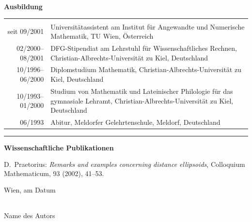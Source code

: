 \documentclass[a4paper,11pt,bibliography=totoc,listof=totoc,headinclude=true,cleardoublepage=empty,oneside]{NumPDEsThesis}
\begin{document}
\noindent
{\bfseries\Large Ausbildung}

\begin{tabular}{rp{}}
\hspace*{.2\textwidth}&\\
seit 09/2001 & Universitätassistent am Institut für Angewandte und Numerische Mathematik, TU Wien, Österreich \\
02/2000--08/2001 & DFG-Stipendiat am Lehrstuhl für Wissenschaftliches Rechnen, Christian-Albrechts-Universität zu Kiel, Deutschland \\ 
10/1996--06/2000 & Diplomstudium Mathematik, Christian-Albrechts-Universität zu Kiel, Deutschland \\
10/1993--01/2000 & Studium von Mathematik und Lateinischer Philologie für das gymnasiale Lehramt, Christian-Albrechts-Universität zu Kiel, Deutschland \\
06/1993 & Abitur, Meldorfer Gelehrtenschule, Meldorf, Deutschland \\
\end{tabular}

\bigskip
\bigskip
\hrule
\bigskip
\bigskip

\noindent
{\bfseries\Large Wissenschaftliche Publikationen}

\bigskip

\noindent
D.~Praetorius: \emph{Remarks and examples concerning distance ellipsoids}, Colloquium Mathematicum, 93 (2002), 41--53.

\vspace*{3cm}

\noindent
Wien, am {\color{change}Datum} %
%
\hfill 
%
\begin{minipage}[t]{5cm}
\centering
\underline{\hspace*{5cm}}\\
\small\color{change}Name des Autors
\end{minipage}
\end{document}

